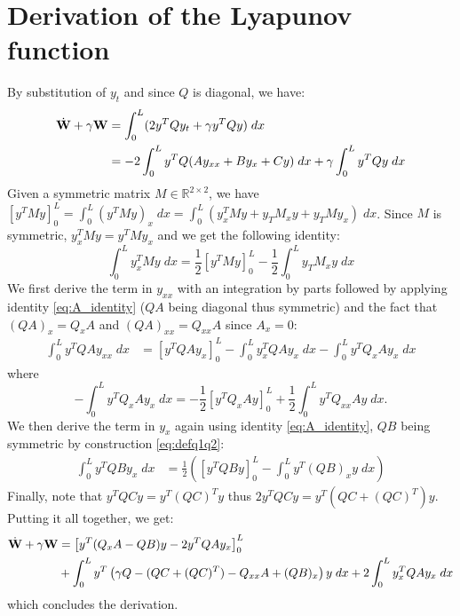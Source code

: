 \documentclass[11pt]{article}
\begin{document}
\section{Derivation of the Lyapunov function}
\label{app:lyapunov_derivation}

By substitution of $y_t$ and since $Q$ is diagonal, we have:
\begin{align}
    \dot{\bf {W}} + \gamma {\bf {W}} &= \int_0^L (2 y^T Q y_t + \gamma y^T Q y) \; dx \\
    &= -2 \int_0^L y^T Q (Ay_{xx} + By_x + Cy) \; dx +  \gamma \int_0^L y^T Q y \; dx
\end{align}
Given a symmetric matrix $M \in \mathbb{R}^{2 \times 2}$, we have $[y^TMy]_0^L = \int_0^L (y^TMy)_x \; dx = \int_0^L (y^T_xMy + y_TM_xy + y_TMy_x) \; dx$. Since $M$ is symmetric, $y^T_xMy = y^TMy_x$ and we get the following identity:
\begin{equation}
    \int_0^L y_x^T M y \; dx = \frac{1}{2} [y^TMy]_0^L - \frac{1}{2} \int_0^L y_TM_xy \; dx
    \label{eq:A_identity}
\end{equation}
We first derive the term in $y_{xx}$ with an integration by parts followed by applying identity \eqref{eq:A_identity} ($QA$ being diagonal thus symmetric) and the fact that $(QA)_x = Q_xA$ and $(QA)_{xx} = Q_{xx}A$ since $A_x=0$:
\begin{equation}
\begin{split}
    \int_0^L y^T QA y_{xx} \; dx &= \left[y^T QA y_x\right]_0^L - \int_0^L y^T_x QA y_x \; dx - \int_0^L y^T Q_xA y_x\;  dx
\end{split}
\end{equation}
where
\begin{equation}
    - \int_0^L y^T Q_xA y_x\;  dx = - \frac 12 \left[ y^T Q_xAy \right]_0^L + \frac 12 \int_0^L y^T Q_{xx}A y\;  dx.
\end{equation}
We then derive the term in $y_x$ again using identity \eqref{eq:A_identity}, $QB$ being symmetric by construction \eqref{eq:defq1q2}:
\begin{align}
    \int_0^L y^T QB y_x \; dx &= \frac 12 \left(\left[ y^T QB y \right]_0^L -  \int_0^L y^T (QB)_x y \; dx\right)
\end{align}
Finally, note that $y^TQCy = y^T(QC)^Ty$ thus $2y^TQCy = y^T(QC+(QC)^T)y$.
Putting it all together, we get:
\begin{align}
\begin{split}
    \dot{\bf {W}} + \gamma {\bf {W}} &= \left[ y^T (Q_xA - QB) y -2 y^T QA y_x\right]_0^L \\ &+ \int_0^L y^T \left(\gamma Q - (QC+(QC)^T)  -Q_{xx}A + (QB)_x \right) y \; dx + 2\int_0^L y^T_x QA y_x \; dx
\end{split}
\end{align}
which concludes the derivation.
\end{document}

